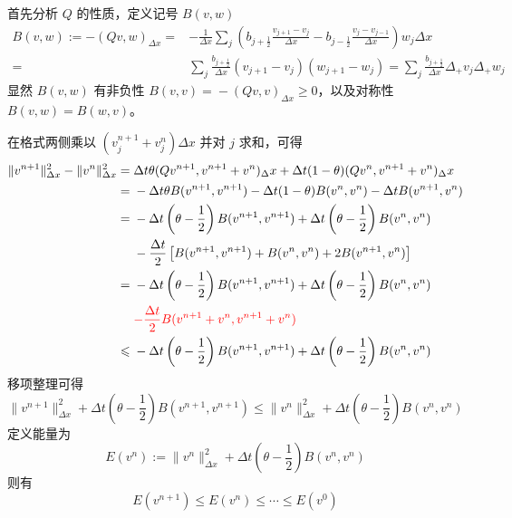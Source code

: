 \begin{solution*}
    首先分析 $Q$ 的性质，定义记号 $B(v,w)$
    \begin{align*}
        B(v,w):= - (Q v,w)_{\Delta x}
        ={} & - \frac{1}{\Delta x} \sum_j \left(b_{j+\frac12}\frac{v_{j+1}-v_{j}}{\Delta x}-b_{j-\frac12}\frac{v_j - v_{j-1}}{\Delta x}\right)w_j \Delta x \\
        ={} & \sum_j \frac{b_{j+\frac12}}{\Delta x}(v_{j+1}-v_{j})(w_{j+1}-w_{j})
        ={}  \sum_j \frac{b_{j+\frac12}}{\Delta x} \Delta_+ v_{j} \Delta_+ w_{j}
    \end{align*}
    显然 $B(v,w)$ 有非负性 $B(v,v) ={} - (Q v,v)_{\Delta x} \ge 0$，以及对称性 $B(v,w) = B(w,v)$。

    在格式两侧乘以 $(v_j^{n+1} + v_j^n)\Delta x$ 并对 $j$ 求和，可得
    \begin{align*}
        \|v^{n+1}\|_{\Delta x}^2 - \|v^{n}\|_{\Delta x}^2
        ={}   &
        \Delta t \theta (Q v^{n+1}, v^{n+1} + v^n)_\Delta x
        + \Delta t (1-\theta) (Q v^{n}, v^{n+1} + v^n)_\Delta x
        \\
        ={}   &
        - \Delta t \theta B(v^{n+1}, v^{n+1}) - \Delta t (1-\theta) B(v^{n}, v^n)
        - \Delta t B(v^{n+1},v^n)
        \\
        ={}   &
        - \Delta t \left(\theta-\frac12\right) B(v^{n+1}, v^{n+1}) + \Delta t \left(\theta-\frac12\right) B(v^{n}, v^n)
        \\
              & - \frac{\Delta t}2 \left[
        B(v^{n+1},v^{n+1}) + B(v^{n},v^n) + 2 B(v^{n+1},v^n)
        \right]                                                                                                                 \\
        ={}   &
        - \Delta t \left(\theta-\frac12\right) B(v^{n+1}, v^{n+1}) + \Delta t \left(\theta-\frac12\right) B(v^{n}, v^n)
        \\
              & {\color{red}-\frac{\Delta t}2 B(v^{n+1}+ v^n,v^{n+1} + v^n)}
        \\
        \le{} & - \Delta t \left(\theta-\frac12\right) B(v^{n+1}, v^{n+1}) + \Delta t \left(\theta-\frac12\right) B(v^{n}, v^n)
    \end{align*}
    移项整理可得
    \[
        \|v^{n+1}\|_{\Delta x}^2 + \Delta t \left(\theta-\frac12\right) B(v^{n+1}, v^{n+1})
        \le{} \|v^{n}\|_{\Delta x}^2 + \Delta t \left(\theta-\frac12\right) B(v^{n}, v^n)
    \]
    定义能量为
    \[
        E(v^n) := \|v^{n}\|_{\Delta x}^2 + \Delta t \left(\theta-\frac12\right) B(v^{n}, v^n)
    \]
    则有
    \[
        E(v^{n+1}) \le E(v^n) \le \cdots \le E(v^0)
    \]


\end{solution*}
